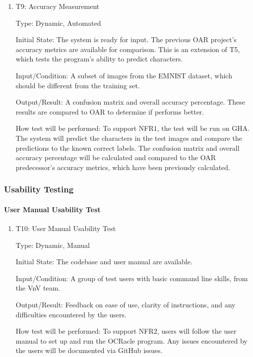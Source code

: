 \documentclass[12pt, titlepage]{article}
\begin{document}
\begin{enumerate}

\item{T9: Accuracy Measurement\\}

Type: Dynamic, Automated
					
Initial State: The \progname{} system is ready for input. The previous
OAR project's accuracy metrics are available for comparison. This is an
extension of T5, which tests the program's ability to predict characters.
					
Input/Condition: A subset of images from the EMNIST dataset, which should be
different from the training set.
					
Output/Result: A confusion matrix and overall accuracy percentage. These results
are compared to OAR to determine if \progname{} performs better.
					
How test will be performed: To support NFR1, the test will be run on GHA. The
system will predict the characters in the test images and compare the
predictions to the known correct labels. The confusion matrix and overall
accuracy percentage will be calculated and compared to the OAR predecessor's
accuracy metrics, which have been previously calculated.

\end{enumerate}

\subsubsection{Usability Testing}

\paragraph{User Manual Usability Test}

\begin{enumerate}

\item{T10: User Manual Usability Test\\}

Type: Dynamic, Manual
					
Initial State: The codebase and user manual are available.
					
Input/Condition: A group of test users with basic command line skills, from the
VnV team.
					
Output/Result: Feedback on ease of use, clarity of instructions, and any
difficulties encountered by the users.
					
How test will be performed: To support NFR2, users will follow the user manual
to set up and run the OCRacle program. Any issues encountered by the users will
be documented via GitHub issues.

\end{enumerate}
\end{document}
